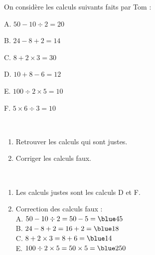 \begin{exercice} %
   On considère les calculs suivants faits par Tom :
   \begin{colitemize}{2}
      \item A. \;$50-10\div2 =20$ \smallskip
      \item B. \;$24-8+2 =14$ \smallskip
      \item C. \;$8+2\times3 =30$
      \item D. \;$10+8-6 =12$
      \item E. \;$100\div2\times5 =10$
      \item F. \;$5\times6\div3 =10$
   \end{colitemize}
   \  \\ [-10mm]
   \begin{enumerate}
      \item Retrouver les calculs qui sont justes.
      \item Corriger les calculs faux.
   \end{enumerate}
\end{exercice}

\begin{corrige}
   \ \\ [-5mm]
   \begin{enumerate}
      \item Les calculs justes sont les calculs {\blue D} et {\blue F}. \smallskip
      \item Correction des calculs faux : \\
         A. $50-10\div2 =50-5 ={\blue 45}$ \\ [1mm]
         B. $24-8+2 =16+2 ={\blue 18}$ \\ [1mm]
         C. $8+2\times3 =8+6 ={\blue 14}$ \\ [1mm]
         E. $100\div2\times5 =50\times5 = {\blue 250}$
   \end{enumerate}
\end{corrige}
